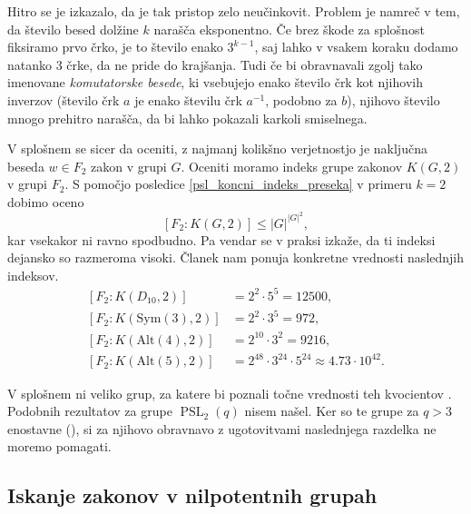 Hitro se je izkazalo, da je tak pristop zelo neučinkovit. Problem je namreč v tem, da število besed dolžine $k$ narašča eksponentno. Če brez škode za splošnost fiksiramo prvo črko, je to število enako $3^{k - 1}$,
saj lahko v vsakem koraku dodamo natanko 3 črke, da ne pride do krajšanja. Tudi če bi obravnavali zgolj tako imenovane \emph{komutatorske besede}, ki vsebujejo enako število črk kot njihovih inverzov (število črk $a$ je enako številu črk $a^{-1}$, podobno za $b$),
njihovo število mnogo prehitro narašča, da bi lahko pokazali karkoli smiselnega.

V splošnem se sicer da oceniti, z najmanj kolikšno verjetnostjo je naključna beseda $w \in F_2$ zakon v grupi $G$.
Oceniti moramo indeks grupe zakonov $K(G, 2)$ v grupi $F_2$. S pomočjo posledice \ref{psl_koncni_indeks_preseka} v primeru $k  = 2$ dobimo oceno
\begin{equation*}
    \left[ F_2 : K(G, 2) \right] \le {\lvert G \rvert}^{{\lvert G \rvert}^2},
    \end{equation*}  
kar vsekakor ni ravno spodbudno. Pa vendar se v praksi izkaže, da ti indeksi dejansko so razmeroma visoki. Članek \cite{Cocke_2020} nam ponuja konkretne vrednosti naslednjih indeksov.
\begin{align*}
    \left[ F_2 : K(D_{10}, 2) \right] &= 2^2 \cdot 5^{5} = 12500, \\
    \left[ F_2 : K(\text{Sym}(3), 2) \right] &= 2^2 \cdot 3^{5} = 972, \\
    \left[ F_2 : K(\text{Alt}(4), 2) \right] &= 2^{10} \cdot  3^{2} = 9216, \\
    \left[ F_2 : K(\text{Alt}(5), 2) \right] &= 2^{48} \cdot  3^{24} \cdot 5^{24} \approx 4.73 \cdot 10^{42}.   %
\end{align*}

V splošnem ni veliko grup, za katere bi poznali točne vrednosti teh kvocientov \cite[str.~1]{Cocke_2020}. Podobnih rezultatov za grupe $\operatorname{PSL}_2(q)$ nisem našel. Ker so te grupe za $q > 3$ enostavne (\cite{Jezernik_2023}), si za njihovo obravnavo
z ugotovitvami naslednjega razdelka ne moremo pomagati.

\subsection{Iskanje zakonov v nilpotentnih grupah}

